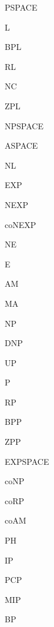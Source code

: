 \usepackage{fullpage}
\usepackage{color}
\usepackage{graphicx}
\usepackage{epsfig}
\usepackage{amsthm}
\usepackage{latexsym}
\usepackage{amssymb}
\usepackage{amsmath}

\newcommand{\newfontobj}[2]{
  \newcommand{#1}[1]{
    \expandafter\def\csname##1\endcsname{{#2 ##1}}}}

\newfontobj{\class}{\rm} %



\class{PSPACE}	
\class{L}
\class{BPL}
\class{RL}
\class{NC}
\class{ZPL}
\class{NPSPACE}	
\class{ASPACE}	
\class{NL}
\class{EXP}
\class{NEXP}
\class{coNEXP}
\class{NE}
\class{E}
\class{AM}		
\class{MA}
\class{NP}
\class{DNP}
\class{UP}
\class{P}
\class{RP}
\class{BPP}
\class{ZPP}
\class{EXPSPACE}
\class{coNP}
\class{coRP}
\class{coAM}
\class{PH}
\class{IP}
\class{PCP}
\class{MIP}

\class{BP}

\newcommand{\SHARPP}{{\#\rm{P}}}
\newcommand{\PARITYP}{{\oplus\rm{P}}}

\DeclareMathOperator{\poly}{poly}
\DeclareMathOperator{\Majority}{Majority}
\DeclareMathOperator{\quasipoly}{quasi-poly}
\DeclareMathOperator{\polylog}{poly-log}
\DeclareMathOperator{\superpoly}{super-poly}
\DeclareMathOperator{\DTISP}{DTISP}
\DeclareMathOperator{\DSPACE}{DSPACE}
\DeclareMathOperator{\DTIME}{DTIME}
\DeclareMathOperator{\NSPACE}{NSPACE}
\DeclareMathOperator{\NTIME}{NTIME}
\DeclareMathOperator{\BPTIME}{BPTIME}
\DeclareMathOperator{\RTIME}{RTIME}
\DeclareMathOperator{\ZPTIME}{ZPTIME}
\DeclareMathOperator{\BPSPACE}{BPSPACE}
\DeclareMathOperator{\RSPACE}{RSPACE}
\DeclareMathOperator{\ZPSPACE}{ZPSPACE}


\newcommand{\CC}{\mathcal{C}}


\newcommand{\lecture}[4]{
\noindent
\fbox{
\begin{minipage}{6.2in}
  {\bf CS 710: Complexity Theory} \hfill #2
  \begin{center}
    {\Large Lecture #1: #3} \\[3mm]
  \end{center}
Instructor: Dieter van Melkebeek \hfill Scribe: #4
\end{minipage}
}
\bigskip

\bigskip
}
\newcommand{\homework}[3]{
\noindent
\fbox{
\begin{minipage}{6.2in}
  {\bf CS 710: Complexity Theory} \hfill #2
  \begin{center}
    {\Large Homework #1} \\[3mm]
  \end{center}
Instructor: Dieter van Melkebeek \hfill #3
\end{minipage}
}
\bigskip

\bigskip
}

